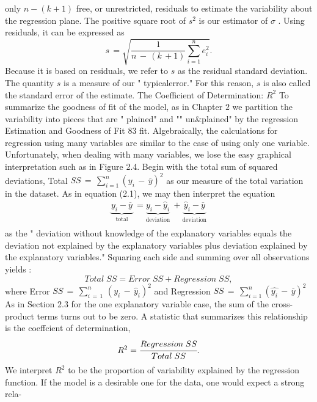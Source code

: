 \documentclass[11pt]{article}
\begin{document}
only \(n-( k+1 )\) free, or unrestricted, residuals to estimate the variability about
 the regression plane.
 The positive square root of \(s^{2}\) is our estimator of \(\sigma\) . Using residuals, it can be
expressed as
\[
s \,=\sqrt{\frac{1} {n \,-\, ( k \,+1 )} \sum_{i=1}^{n} e_{i}^{2}} . \tag{3.8}
\]
Because it is based on residuals, we refer to \(s\) as the residual standard deviation.
 The quantity \(s\) is a measure of our " typicalerror." For this reason, \(s\) is also called
 the standard error of the estimate.
The Coefficient of Determination: \(R^{2}\)
To summarize the goodness of fit of the model, as in Chapter \(2\) we partition the
variability into pieces that are " plained" and "" un\&plained" by the regression
 Estimation and Goodness of Fit 83
 fit. Algebraically, the calculations for regression using many variables are similar
 to the case of using only one variable. Unfortunately, when dealing with many
variables, we lose the easy graphical interpretation such as in Figure 2.4.
Begin with the total sum of squared deviations, Total \(S S \,=\, \sum_{i=1}^{n} \left( y_{i} \,-\, \overline{{y}} \right)^{2}\)
 as our measure of the total variation in the dataset. As in equation (2.1), we may
then interpret the equation
\[
\begin{array} {c} {\underbrace{y_{i}-\overline{{y}}}_{\mathrm{t o t a l}} \ =\underbrace{y_{i}-\widehat{y}_{i}}_{\mathrm{d e v i a t i o n}} \ +\underbrace{\widehat{y}_{i}-\overline{{y}}}_{\mathrm{d e v i a t i o n}}} \\ \end{array}
\]
 as the " deviation without knowledge of the explanatory variables equals the
 deviation not explained by the explanatory variables plus deviation explained by
 the explanatory variables." Squaring each side and summing over all observations
yields
:
\[
\mathit{T o t a l} \; \mathit{S S}=\mathit{E r r o r} \; \mathit{S S}+\mathit{R e g r e s s i o n} \; \mathit{S S} ,
\]
 where Error \(S S \,=\, \sum_{i \,=\, 1}^{n} \, ( y_{i} \,-\, \widehat{y}_{i} )^{2}\) and Regression \(S S \,=\, \sum_{i=1}^{n} \left( \widehat{y_{i}} \,-\, \overline{{y}} \right)^{2}\) As in
Section 2.3 for the one explanatory variable case, the sum of the cross-product
terms turns out to be zero.
 A statistic that summarizes this relationship is the coeffcient of determination,
\[
R^{2}=\cfrac{R e g r e s s i o n \; S S} {T o t a l \; S S} .
\]
We interpret \(R^{2}\) to be the proportion of variability explained by the regression
function.
If the model is a desirable one for the data, one would expect a strong rela-
\end{document}
